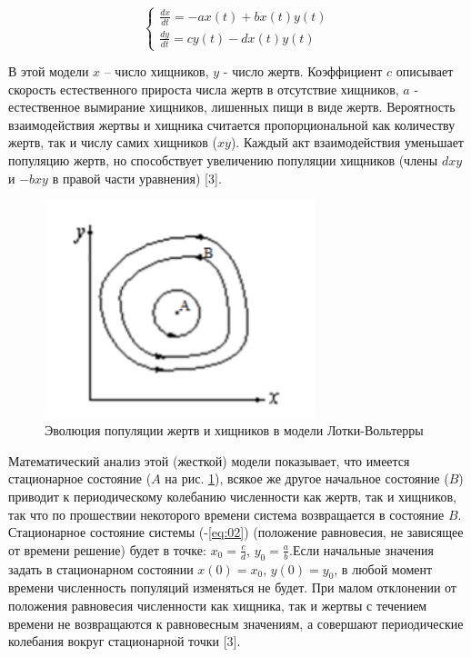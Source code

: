 \documentclass[
  12pt,
  a4paper,
]{scrreprt}
\begin{document}
\begin{equation}
   \begin{cases}
     \frac{dx}{dt} = -ax(t)+bx(t)y(t)
     \\
     \frac{dy}{dt} = cy(t)-dx(t)y(t)
   \end{cases}
\label{eq:02}\end{equation}

В этой модели \(x\) – число хищников, \(y\) - число жертв. Коэффициент
\(c\) описывает скорость естественного прироста числа жертв в отсутствие
хищников, \(a\) - естественное вымирание хищников, лишенных пищи в виде
жертв. Вероятность взаимодействия жертвы и хищника считается
пропорциональной как количеству жертв, так и числу самих хищников
(\(xy\)). Каждый акт взаимодействия уменьшает популяцию жертв, но
способствует увеличению популяции хищников (члены \(dxy\) и \(-bxy\) в
правой части уравнения) {[}3{]}.

\begin{figure}
\hypertarget{fig:001}{%
\centering
\includegraphics[width=0.7\textwidth,height=\textheight]{./tex2pdf.-cd896adee9a74d13/image/1.png}
\caption{Эволюция популяции жертв и хищников в модели
Лотки-Вольтерры}\label{fig:001}
}
\end{figure}

Математический анализ этой (жесткой) модели показывает, что имеется
стационарное состояние (\(A\) на рис. \ref{fig:001}), всякое же другое
начальное состояние (\(B\)) приводит к периодическому колебанию
численности как жертв, так и хищников, так что по прошествии некоторого
времени система возвращается в состояние \(B\). Стационарное состояние
системы (-\ref{eq:02}) (положение равновесия, не зависящее от времени
решение) будет в точке: \(x_0=\frac{c}{d}\), \(y_0=\frac{a}{b}\).Если
начальные значения задать в стационарном состоянии \(x(0)=x_0\),
\(y(0)=y_0\), в любой момент времени численность популяций изменяться не
будет. При малом отклонении от положения равновесия численности как
хищника, так и жертвы с течением времени не возвращаются к равновесным
значениям, а совершают периодические колебания вокруг стационарной точки
{[}3{]}.
\end{document}
